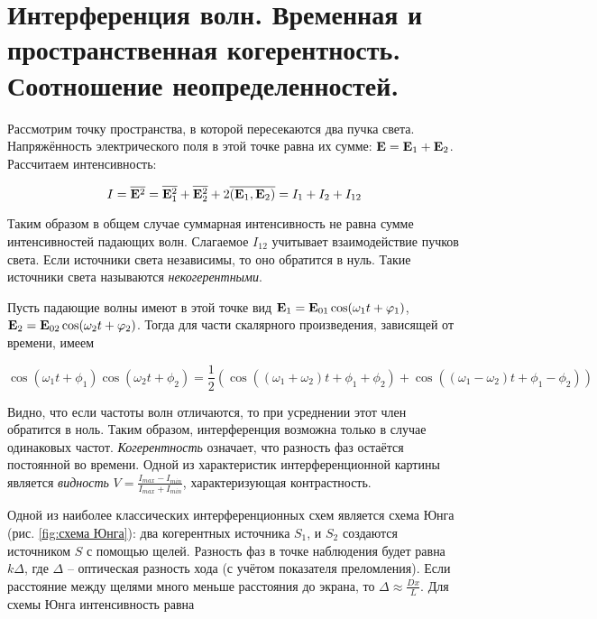 \section{Интерференция волн. Временная и пространственная когерентность. Соотношение неопределенностей.}

Рассмотрим точку пространства, в которой пересекаются два пучка света. Напряжённость электрического поля в этой точке равна их сумме: $\mathbf E = \mathbf E_1 + \mathbf E_2$. Рассчитаем интенсивность:

\begin{equation*}
    I = \overline{\mathbf E^2} = \overline{\mathbf E_1^2} + \overline{\mathbf E_2^2} + 2 \overline{\left( \mathbf E_1, \mathbf E_2 \right)} = I_1 + I_2 + I_{12}
\end{equation*}

\noindent
Таким образом в общем случае суммарная интенсивность не равна сумме интенсивностей падающих волн. Слагаемое $I_{12}$ учитывает взаимодействие пучков света. Если источники света независимы, то оно обратится в нуль. Такие источники света называются \textit{некогерентными}.

Пусть падающие волны имеют в этой точке вид $\mathbf E_1 = \mathbf E_{0 1} \cos (\omega_1 t + \varphi_1)$, $\mathbf E_2 = \mathbf E_{0 2} \cos (\omega_2 t + \varphi_2)$. Тогда для части скалярного произведения, зависящей от времени, имеем

\begin{equation*}
    \cos (\omega_1 t + \phi_1) \cos (\omega_2 t + \phi_2) = \frac{1}{2} \left( \cos ((\omega_1 + \omega_2)t + \phi_1 + \phi_2) + \cos ((\omega_1 - \omega_2)t + \phi_1 - \phi_2) \right)
\end{equation*}

\noindent
Видно, что если частоты волн отличаются, то при усреднении этот член обратится в ноль. Таким образом, интерференция возможна только в случае одинаковых частот. \textit{Когерентность} означает, что разность фаз остаётся постоянной во времени. Одной из характеристик интерференционной картины является \textit{видность} $V = \frac{I_{max} - I_{min}}{I_{max} + I_{min}}$, характеризующая контрастность.

Одной из наиболее классических интерференционных схем является схема Юнга (рис. \ref{fig:схема Юнга}): два когерентных источника $S_1$, и $S_2$ создаются источником $S$ с помощью щелей. Разность фаз в точке наблюдения будет равна $k \Delta$, где $\Delta$ -- оптическая разность хода (с учётом показателя преломления). Если расстояние между щелями много меньше расстояния до экрана, то $\Delta \approx \frac{D x}{L}$. Для схемы Юнга интенсивность равна

